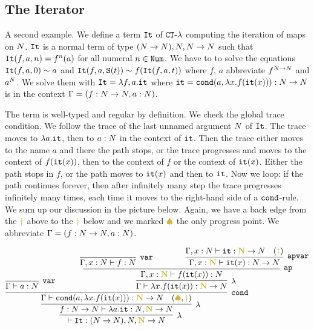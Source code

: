 \documentclass{article}
\begin{document}
\subsection{The Iterator}
A second example. We define a term ${\tt It}$ of  ${ {\tt CT} \mbox{-} \lambda}$ computing the iteration of maps on ${N}$.
${\tt It}$ is a normal term of type $({N} \rightarrow {N}), {N},{N} \rightarrow {N}$ such that
${\tt It}(f,a,n)=f^n(a)$ for all numeral $n \in {\tt Num}$. 
We have to to solve the equations ${\tt It}(f,a,0) \sim a$ and ${\tt It}(f,a,{\tt S} (t)) \sim f({\tt It}(f,a,t))$
where $f$, $a$ abbreviate $f^{{N}\rightarrow{N}}$ and $a^{N}$.
We solve them with ${\tt It} = \lambda f, a.{\tt it}$
where ${\tt it} = {\tt cond} (a, \lambda x.f({\tt it}(x))):{N} \rightarrow {N}$ 
is in the context $\Gamma = (f:{N} \rightarrow {N}, a:{N})$.

The term is well-typed and regular by definition. We check the global trace condition. 
We follow the trace of the last unnamed argument ${N}$ of ${\tt It}$. The trace moves
to $\lambda a.{\tt it}$, then to $a:{N}$ in the context of ${\tt it}$.
Then the trace either moves to the name $a$ and there the path stops, or 
the trace progresses and moves to the context of $f({\tt it}(x))$, then to the context of $f$ or the context of ${\tt it}(x)$. 
Either the path stops in $f$, or the path moves to ${\tt it}(x)$ and then to ${\tt it}$.
Now we loop: if the path continues forever, then after infinitely many step the trace 
progresses infinitely many times, each time it moves to the right-hand side of a ${\tt cond}$-rule.
We sum up our discussion in the picture below. 
Again, we have a back edge from the 
$\bfColor{oldgold}{\dagger}$ above to the $\bfColor{oldgold}{\dagger}$ below
and we marked $\bfColor{oldgold}{ \spadesuit}$ the only progress point.
We abbreviate $\Gamma = (f:{N} \rightarrow {N}, a:{N})$.


\[
\infer[\lambda]{ %
  \vdash \Iter:(\N \rightarrow \N), \N, \bfColor{oldgold}{\N} \rightarrow \N
 }{
  \infer[\lambda]{ %
  f:\N \rightarrow \N
  \vdash \lambda a.\iter:\N, \bfColor{oldgold}{\N} \rightarrow \N
  }{
    \infer[\cond]{ %
      \Gamma 
      \vdash \cond(a,\lambda x.f(\iter(x))): \bfColor{oldgold}{\N} \rightarrow \N 
        \ \ \ (\bfColor{oldgold}{ \spadesuit}, \bfColor{oldgold}{\dagger})
     }{ 
         \infer[\var]{
       \Gamma 
      \vdash a:\N}{}
     &
        {\ \ \ \ \ \ }
        {\infer[\lambda] %
         {
         \Gamma
          \vdash \lambda x.f(\iter(x)):\bfColor{oldgold}{\N} \rightarrow \N
         }{
         \infer[\ap]{ %
           \Gamma, x:\bfColor{oldgold}{\N}
          \vdash f(\iter(x)):\N
           }{
          \infer[\var]{
       \Gamma, x:\N 
      \vdash f:\N}{}
           {\ \ \ \ \ \ \ \ \ \ \ \ }
           {\infer[\apvar] %
            {\Gamma, x:\bfColor{oldgold}{\N}
        \vdash \iter(x): \N \rightarrow \N 
             }{
          \Gamma, x:\N
        \vdash \iter: \bfColor{oldgold}{\N} \rightarrow \N
         \ \ \ (\bfColor{oldgold}{ \dagger})}}
        }%
      }%
    }%
   }%
 }%
}%
\]
\end{document}
